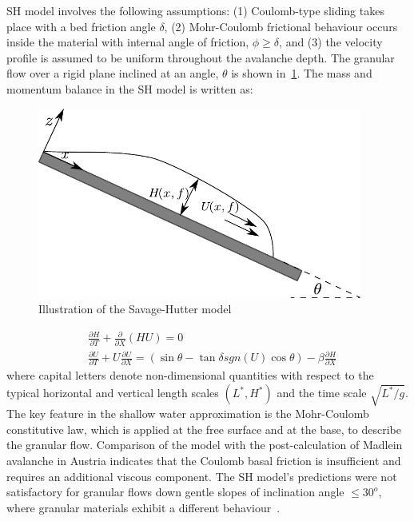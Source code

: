 SH model involves the following assumptions: (1) Coulomb-type sliding takes 
place with a bed friction angle $\delta$, (2) Mohr-Coulomb frictional behaviour 
occurs inside the material with internal angle of friction, $\phi \ge \delta$, 
and (3) the velocity profile is assumed to be uniform throughout the avalanche 
depth. The granular flow over a rigid plane inclined at an angle, $\theta$ is 
shown in~\cref{fig:SH}. The mass and momentum balance in the SH model is 
written as:
\begin{figure}[htbp]
\centering
\includegraphics[width=0.95\textwidth]{SH}
\caption{Illustration of the Savage-Hutter model}
\label{fig:SH}
\end{figure}
\begin{align}
& \frac{\partial \textit{H}}{\partial \textit{T}} + \frac{\partial}{\partial 
\textit{X}} (\textit{HU}) = 0 \\
& \frac{\partial \textit{U}}{\partial \textit{T}} + \textit{U} \frac{\partial 
\textit{U}}{\partial \textit{X}} = (\sin \theta - \tan \delta 
\textit{sgn}(\textit{U}) \cos \theta) -\beta \frac{\partial 
\textit{H}}{\partial \textit{X}}
\end{align}
where capital letters denote non-dimensional quantities with respect to the 
typical horizontal and vertical length scales $(\textit{L}^{*},\textit{H}^{*})$ 
and the time scale $\sqrt{\textit{L}^{*}/\textit{g}}$. The key feature in the 
shallow water approximation is the Mohr-Coulomb constitutive law, which is 
applied at the free surface and at the base, to describe the granular flow. 
Comparison of the model with the post-calculation of Madlein avalanche in 
Austria indicates that the Coulomb basal friction is insufficient and requires 
an additional viscous component. The SH model's predictions were not 
satisfactory for granular flows down gentle slopes of inclination angle $\le 
30^{o}$, where granular materials exhibit a different 
behaviour~\citep{Hutter2005}.

